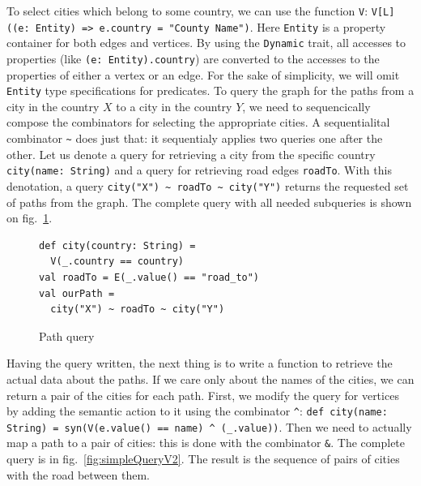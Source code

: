 To select cities which belong to some country, we can use the function \lstinline{V}: \lstinline{V[L]((e: Entity) => e.country = "County Name")}.
Here \lstinline{Entity} is a property container for both edges and vertices. 
By using the \lstinline{Dynamic} trait, all accesses to properties (like \lstinline{(e: Entity).country}) are converted to the accesses to the properties of either a vertex or an edge.
For the sake of simplicity, we will omit \lstinline{Entity} type specifications for predicates. 
To query the graph for the paths from a city in the country $X$ to a city in the country $Y$, we need to sequencically compose the combinators for selecting the appropriate cities. 
A sequentialital combinator \lstinline{~} does just that: it sequentialy applies two queries one after the other. 
Let us denote a query for retrieving a city from the specific country \lstinline{city(name: String)} and a query for retrieving road edges \lstinline{roadTo}. 
With this denotation, a query \lstinline{city("X") ~ roadTo ~ city("Y")} returns the requested set of paths from the graph.
The complete query with all needed subqueries is shown on fig.~\ref{fig:simpleQuery}.

\begin{figure}[h]
\begin{lstlisting}
def city(country: String) =
  V(_.country == country)
val roadTo = E(_.value() == "road_to")
val ourPath = 
  city("X") ~ roadTo ~ city("Y")
\end{lstlisting}
\caption{Path query}
\label{fig:simpleQuery}
\end{figure}

Having the query written, the next thing is to write a function to retrieve the actual data about the paths.
If we care only about the names of the cities, we can return a pair of the cities for each path.
First, we modify the query for vertices by adding the semantic action to it using the combinator \lstinline{^}: \lstinline{def city(name: String) = syn(V(e.value() == name) ^ (_.value))}.
Then we need to actually map a path to a pair of cities: this is done with the combinator \lstinline{&}.
The complete query is in fig.~\ref{fig:simpleQueryV2}.
The result is the sequence of pairs of cities with the road between them.


